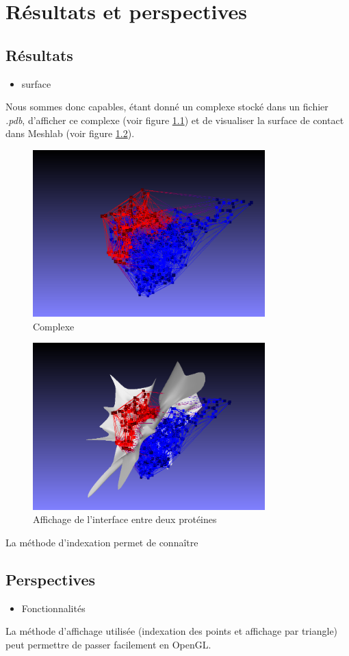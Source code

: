 \chapter{Résultats et perspectives}

\section{Résultats}

\begin{itemize}
  \item surface
\end{itemize}

Nous sommes donc capables, étant donné un complexe stocké dans un fichier \textit{.pdb},
d'afficher ce complexe (voir figure \ref{fig::complexe}) et de visualiser la surface de contact dans Meshlab
(voir figure \ref{fig::affichage_final}).

\begin{figure}[ht]
\centering
  \includegraphics[width=0.8\textwidth]{figures/final_no_surf.png}
  \caption{Complexe}
  \label{fig::complexe}
\end{figure}

\begin{figure}[ht]
\centering
  \includegraphics[width=0.8\textwidth]{figures/final_with_surf.png}
  \caption{Affichage de l'interface entre deux protéines}
  \label{fig::affichage_final}
\end{figure}

La méthode d'indexation permet de connaître



\section{Perspectives}
\begin{itemize}
  \item Fonctionnalités
\end{itemize}

La méthode d'affichage utilisée (indexation des points et affichage par triangle)
peut permettre de passer facilement en OpenGL.
